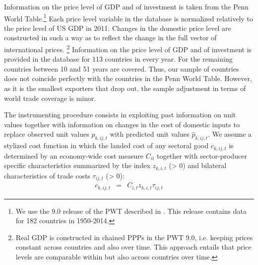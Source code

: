 \documentclass[12pt,twoside,a4paper,notitlepage]{article}
\newcommand{\noteLA}[1]{\textcolor{blue}{\footnotesize\textit{{noteLA: #1}}}} %
\def\noteLA #1{} %
\begin{document}
Information on the price level of GDP and of investment is taken from the Penn World Table.\footnote{We use the 9.0 release of the PWT described in \cite{Feenstra2015}. This release contains data for 182 countries in 1950-2014.}
Each price level variable in the database is normalized relatively to the price level of US GDP in 2011.
Changes in the domestic price level are constructed in such a way as to reflect the change in the full vector of international prices.
\footnote{Real GDP is constructed in chained PPPs in the PWT 9.0, i.e. keeping prices constant across countries and also over time.
	This approach entails that price levels are comparable within but also across countries over time.} 
Information on the price level of GDP and of investment is provided in the database for 113 countries in every year.
For the remaining countries between 10 and 51 years are covered.
Thus, our sample of countries does not coincide perfectly with the countries in the Penn World Table.
However, as it is the smallest exporters that drop out, the sample adjustment in terms of world trade coverage is minor.

The instrumenting procedure consists in exploiting past information on unit values together with information on changes in the cost of domestic inputs to replace observed unit values ${{p}_{k,ij,t}}$ with predicted unit values ${{\hat{p}}_{k,ij,t}}$. 
We assume a stylized cost function in which the landed cost of any sectoral good $c_{k,ij,t}$ is determined by an economy-wide cost measure ${{C}_{it}}$ together with sector-producer specific characteristics summarized by the index ${{z}_{k,i,t}}$ (> 0) and bilateral characteristics of trade costs $\tau_{ij,t}$ (> 0):
\begin{eqnarray}
{{c}_{k,ij,t}}&=&{{C}_{i,t}}{{z}_{k,i,t}}\tau_{ij,t}\nonumber
\end{eqnarray}
\end{document}
